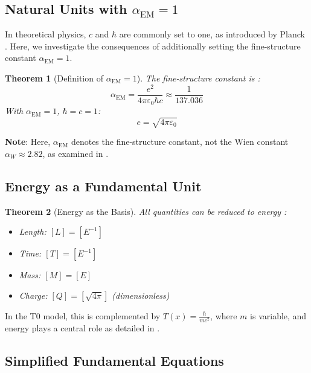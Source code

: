\documentclass[12pt,a4paper]{article}
\newcommand{\Tfield}{T(x)}
\newcommand{\alphaEM}{\alpha_{\text{EM}}}
\newtheorem{theorem}{Theorem}[section]
\begin{document}
	\subsection{Natural Units with \(\alphaEM = 1\)}
	\label{subsec:alpha_one}
	
	In theoretical physics, \(c\) and \(\hbar\) are commonly set to one, as introduced by Planck \cite{planck1899}. Here, we investigate the consequences of additionally setting the fine-structure constant \(\alphaEM = 1\).
	
	\begin{theorem}[Definition of \(\alphaEM = 1\)]
		The fine-structure constant is \cite{Feynman1985}:
		\begin{equation}
			\alphaEM = \frac{e^2}{4\pi\varepsilon_0 \hbar c} \approx \frac{1}{137.036}
		\end{equation}
		With \(\alphaEM = 1\), \(\hbar = c = 1\):
		\begin{equation}
			e = \sqrt{4\pi\varepsilon_0}
		\end{equation}
	\end{theorem}
	
	\textbf{Note}: Here, \(\alphaEM\) denotes the fine-structure constant, not the Wien constant \(\alpha_W \approx 2.82\), as examined in \cite{pascher_temp_2025}.
	
	\subsection{Energy as a Fundamental Unit}
	\label{subsec:energy_fundamental}
	
	\begin{theorem}[Energy as the Basis]
		All quantities can be reduced to energy \cite{Duff2002}:
		\begin{itemize}
			\item Length: \([L] = [E^{-1}]\)
			\item Time: \([T] = [E^{-1}]\)
			\item Mass: \([M] = [E]\)
			\item Charge: \([Q] = [\sqrt{4\pi}]\) (dimensionless)
		\end{itemize}
	\end{theorem}
	
	In the T0 model, this is complemented by \(\Tfield = \frac{\hbar}{m c^2}\), where \(m\) is variable, and energy plays a central role as detailed in \cite{pascher_zeit_masse_2025}.
	
	\subsection{Simplified Fundamental Equations}
	\label{subsec:simplified_equations}
	
\end{document}
